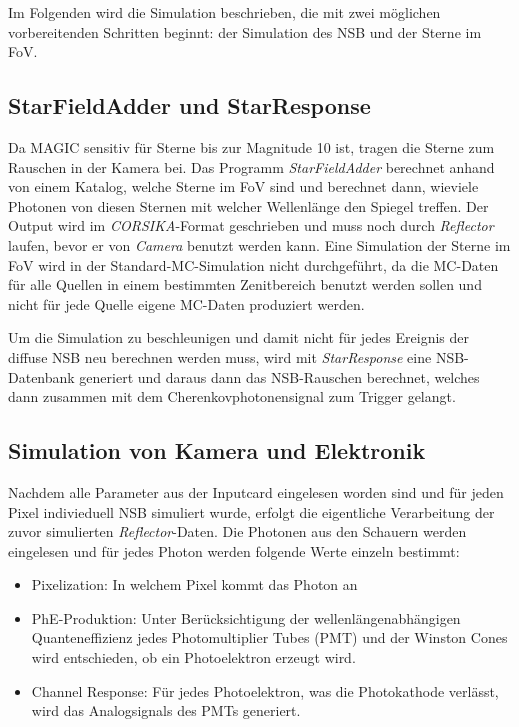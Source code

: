 Im Folgenden wird die Simulation beschrieben, die mit zwei möglichen vorbereitenden Schritten beginnt: der Simulation des NSB und der Sterne im FoV.

\subsection{StarFieldAdder und StarResponse}
Da MAGIC sensitiv für Sterne bis zur Magnitude 10 ist, tragen die Sterne zum Rauschen in der Kamera bei.
Das Programm \textit{StarFieldAdder} berechnet anhand von einem Katalog, welche Sterne im FoV sind und berechnet dann, wieviele Photonen von diesen Sternen mit welcher Wellenlänge den Spiegel treffen.
Der Output wird im \textit{CORSIKA}-Format geschrieben und muss noch durch \textit{Reflector} laufen, bevor er von \textit{Camera} benutzt werden kann.
Eine Simulation der Sterne im FoV wird in der Standard-MC-Simulation nicht durchgeführt, da die MC-Daten für alle Quellen in einem bestimmten Zenitbereich benutzt werden sollen und nicht für jede Quelle eigene MC-Daten produziert werden.

Um die Simulation zu beschleunigen und damit nicht für jedes Ereignis der diffuse NSB neu berechnen werden muss, wird mit \textit{StarResponse} eine NSB-Datenbank generiert und daraus dann das NSB-Rauschen berechnet, welches dann zusammen mit dem Cherenkovphotonensignal zum Trigger gelangt.

\subsection{Simulation von Kamera und Elektronik}
Nachdem alle Parameter aus der Inputcard eingelesen worden sind und für jeden Pixel indivieduell NSB simuliert wurde, erfolgt die eigentliche Verarbeitung der zuvor simulierten \textit{Reflector}-Daten.
Die Photonen aus den Schauern werden eingelesen und für jedes Photon werden folgende Werte einzeln bestimmt:

\begin{itemize}
 \item Pixelization: In welchem Pixel kommt das Photon an
 \item PhE-Produktion: Unter Berücksichtigung der wellenlängenabhängigen Quanteneffizienz jedes Photomultiplier Tubes (PMT) und der Winston Cones wird entschieden, ob ein Photoelektron erzeugt wird.
 \item Channel Response: Für jedes Photoelektron, was die Photokathode verlässt, wird das Analogsignals des PMTs generiert.
\end{itemize}

